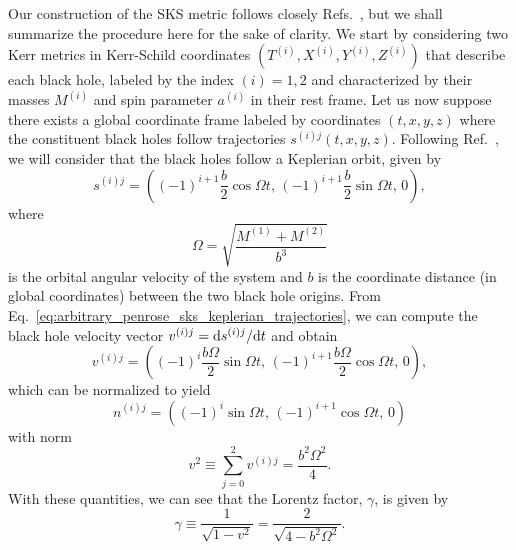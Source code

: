 Our construction of the \ac{SKS} metric follows closely Refs.~\cite{Armengol:2021shd, PhysRevD.104.044041}, but we shall summarize the procedure here for the sake of clarity. We start by considering two Kerr metrics in Kerr-Schild coordinates $(T^{(i)}, X^{(i)}, Y^{(i)}, Z^{(i)})$ that describe each black hole, labeled by the index $(i) = 1,2$ and characterized by their masses $M^{(i)}$ and spin parameter $a^{(i)}$ in their rest frame. Let us now suppose there exists a global coordinate frame labeled by coordinates $(t,x,y,z)$ where the constituent black holes follow trajectories $s^{(i) j}(t, x, y, z)$. Following Ref.~\cite{Armengol:2021shd}, we will consider that the black holes follow a Keplerian orbit, given by
%
\begin{equation}
  s^{(i) j} = \left((-1)^{i + 1}\frac{b}{2}\cos\Omega t,\, (-1)^{i + 1}\frac{b}{2}\sin\Omega t,\, 0 \right),
  \label{eq:arbitrary_penrose_sks_keplerian_trajectories}
\end{equation}
%
where
%
\begin{equation}
  \Omega = \sqrt{\frac{M^{(1)} + M^{(2)}}{b^3}}
  \label{eq:arbitrary_penrose_sks_angular_velocity}
\end{equation}
%
is the orbital angular velocity of the system and $b$ is the coordinate distance (in global coordinates) between the two black hole origins. From Eq.~\eqref{eq:arbitrary_penrose_sks_keplerian_trajectories}, we can compute the black hole velocity vector $v^{(i) j} = \mathrm{d} s^{(i) j} / \mathrm{d} t$ and obtain
%
\begin{equation}
  v^{(i) j} = \left( (-1)^i \frac{b\Omega}{2} \sin \Omega t,\, (-1)^{i+1} \frac{b\Omega}{2} \cos\Omega t,\, 0 \right),
  \label{eq:arbitrary_penrose_sks_keplerian_velocities}
\end{equation}
%
which can be normalized to yield
%
\begin{equation}
  n^{(i) j} = \left( (-1)^i \sin\Omega t,\, (-1)^{i+1}\cos\Omega t,\, 0 \right)
  \label{eq:arbitrary_penrose_sks_keplerian_velocities_norms}
\end{equation}
%
with norm
%
\begin{equation}
  v^2 \equiv \sum_{j = 0}^{2} v^{(i) j} = \frac{b^2 \Omega^2}{4}.
  \label{eq:arbitrary_penrose_sks_keplerian_velocities_norm}
\end{equation}
%
With these quantities, we can see that the Lorentz factor, $\gamma$, is given by
%
\begin{equation}
  \gamma \equiv \frac{1}{\sqrt{1 - v^2}} = \frac{2}{\sqrt{4 - b^2\Omega^2}}.
  \label{eq:arbitrary_penrose_sks_keplerian_orbit_lorentz_factor}
\end{equation}


